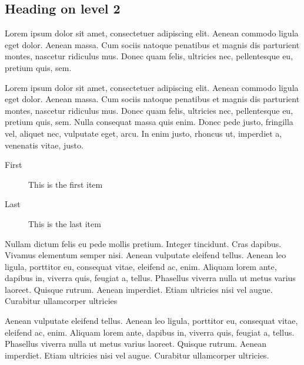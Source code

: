 \subsection*{Heading on level 2}
Lorem ipsum dolor sit amet, consectetuer adipiscing elit. Aenean commodo ligula
eget dolor. Aenean massa. Cum sociis natoque penatibus et magnis dis parturient
montes, nascetur ridiculus mus. Donec quam felis, ultricies nec, pellentesque
eu, pretium quis, sem. 

Lorem ipsum dolor sit amet, consectetuer adipiscing elit. Aenean commodo ligula
eget dolor. Aenean massa. Cum sociis natoque penatibus et magnis dis parturient
montes, nascetur ridiculus mus. Donec quam felis, ultricies nec, pellentesque
eu, pretium quis, sem. Nulla consequat massa quis enim. Donec pede justo,
fringilla vel, aliquet nec, vulputate eget, arcu. In enim justo, rhoncus ut,
imperdiet a, venenatis vitae, justo. 
\begin{description}
	\item[First] This is the first item
	\item[Last] This is the last item
\end{description}
Nullam dictum felis eu pede mollis pretium. Integer tincidunt. Cras dapibus.
Vivamus elementum semper nisi. Aenean vulputate eleifend tellus. Aenean leo
ligula, porttitor eu, consequat vitae, eleifend ac, enim. Aliquam lorem ante,
dapibus in, viverra quis, feugiat a, tellus. Phasellus viverra nulla ut metus
varius laoreet. Quisque rutrum. Aenean imperdiet. Etiam ultricies nisi vel
augue. Curabitur ullamcorper ultricies 

Aenean vulputate eleifend tellus. Aenean leo
ligula, porttitor eu, consequat vitae, eleifend ac, enim. Aliquam lorem ante,
dapibus in, viverra quis, feugiat a, tellus. Phasellus viverra nulla ut metus
varius laoreet. Quisque rutrum. Aenean imperdiet. Etiam ultricies nisi vel
augue. Curabitur ullamcorper ultricies.

\lipsum[1-20]

